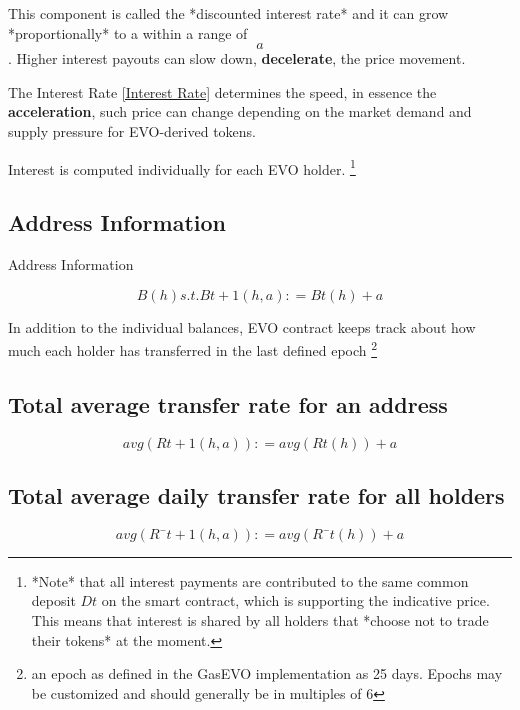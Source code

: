 This component is called the *discounted interest rate* and it can grow *proportionally* to a within a range of 
\begin{equation}
	[0, 0.24] a 
\end{equation}
.
Higher interest payouts can slow down, \textbf{decelerate}, the price movement. 

The Interest Rate \ref{Interest Rate} determines the speed, in essence the \textbf{acceleration}, such price can change depending on the market demand and supply pressure for EVO-derived tokens.

Interest is computed individually for each EVO holder. \footnote{
*Note* that all interest payments are contributed to the same common deposit $Dt$ on the smart contract, which is supporting the indicative price. This means that interest is shared by all holders that *choose not to trade their tokens* at the moment.}




\label{sec:Calculations}
\subsection{Address Information}
Address Information


\begin{equation}
	B(h) s.t. Bt + 1(h, a): = Bt(h) + a 
\end{equation}


In addition to the individual balances, EVO contract keeps track about how much each holder has transferred in the last defined epoch \footnote{an epoch as defined in the GasEVO implementation as 25 days. Epochs may be customized and should generally be in multiples of 6}

\label{sec:Calculations}
\subsection{Total average transfer rate for an address}

\begin{equation}
	avg(Rt + 1(h, a)): = avg(Rt(h)) + a
\end{equation}


\label{sec:Calculations}
\subsection{Total average daily transfer rate for all holders}
\begin{equation}
	avg(R¯ t + 1(h, a)): = avg(R¯t(h)) + a
\end{equation}

